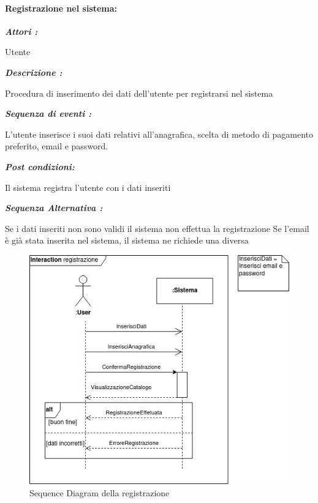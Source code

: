 \documentclass{article}
\begin{document}
\newpage


\paragraph{Registrazione nel sistema:}

\begin{mdframed}

	\noindent\textit{\textbf{Attori :}}


	Utente

	\noindent\textit{\textbf{Descrizione :}}


	Procedura di inserimento dei dati dell’utente per registrarsi nel
	sistema

	\noindent\textit{\textbf{Sequenza di eventi :}}


	L’utente inserisce i suoi dati relativi all'anagrafica,
	scelta di metodo di pagamento preferito, email e password.

	\noindent\textit{\textbf{Post condizioni:}}


	Il sistema registra l’utente con i dati inseriti

	\noindent\textit{\textbf{Sequenza Alternativa :}}


	Se i dati inseriti non sono validi il sistema non effettua la
	registrazione
	Se l'email è già stata inserita nel sistema,
	il sistema ne richiede una diversa
\end{mdframed}

\begin{figure}[h!]
	\centering
	\includegraphics[width=\textwidth]{SDregistrazione.jpg}
	\caption{Sequence Diagram della registrazione}
	\label{fig:SDregistrazione}
\end{figure}
\newpage
\end{document}
